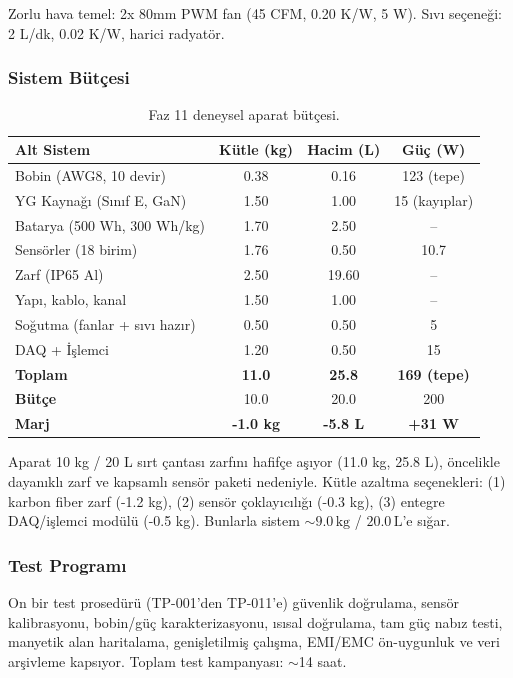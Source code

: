 Zorlu hava temel: 2x 80mm PWM fan (45 CFM, 0.20 K/W, 5 W). Sıvı seçeneği: 2 L/dk, 0.02 K/W, harici radyatör.

\subsubsection{Sistem Bütçesi}

\begin{table}[t]
\centering
\caption{Faz 11 deneysel aparat bütçesi.}
\label{tab:phase11-budget-tr}
\begin{tabular}{lccc}
\hline
Alt Sistem & Kütle (kg) & Hacim (L) & Güç (W) \\
\hline
Bobin (AWG8, 10 devir) & 0.38 & 0.16 & 123 (tepe) \\
YG Kaynağı (Sınıf E, GaN) & 1.50 & 1.00 & 15 (kayıplar) \\
Batarya (500 Wh, 300 Wh/kg) & 1.70 & 2.50 & -- \\
Sensörler (18 birim) & 1.76 & 0.50 & 10.7 \\
Zarf (IP65 Al) & 2.50 & 19.60 & -- \\
Yapı, kablo, kanal & 1.50 & 1.00 & -- \\
Soğutma (fanlar + sıvı hazır) & 0.50 & 0.50 & 5 \\
DAQ + İşlemci & 1.20 & 0.50 & 15 \\
\hline
\textbf{Toplam} & \textbf{11.0} & \textbf{25.8} & \textbf{169 (tepe)} \\
\textbf{Bütçe} & 10.0 & 20.0 & 200 \\
\textbf{Marj} & \textbf{-1.0 kg} & \textbf{-5.8 L} & \textbf{+31 W} \\
\hline
\end{tabular}
\end{table}

Aparat 10 kg / 20 L sırt çantası zarfını hafifçe aşıyor (11.0 kg, 25.8 L), öncelikle dayanıklı zarf ve kapsamlı sensör paketi nedeniyle. Kütle azaltma seçenekleri: (1) karbon fiber zarf (-1.2 kg), (2) sensör çoklayıcılığı (-0.3 kg), (3) entegre DAQ/işlemci modülü (-0.5 kg). Bunlarla sistem $\sim 9.0\,\text{kg}$ / $20.0\,\text{L}$'e sığar.

\subsubsection{Test Programı}

On bir test prosedürü (TP-001'den TP-011'e) güvenlik doğrulama, sensör kalibrasyonu, bobin/güç karakterizasyonu, ısısal doğrulama, tam güç nabız testi, manyetik alan haritalama, genişletilmiş çalışma, EMI/EMC ön-uygunluk ve veri arşivleme kapsıyor. Toplam test kampanyası: $\sim$14 saat.


